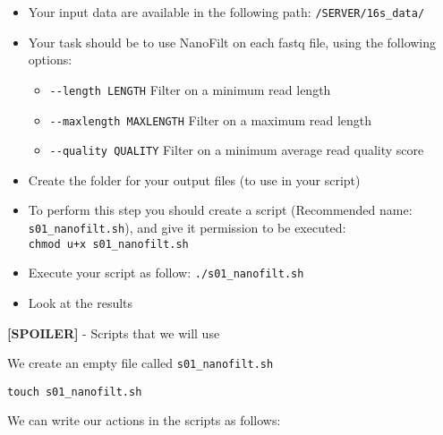 \documentclass[
]{book}
\newenvironment{Shaded}{\begin{snugshade}}{\end{snugshade}}
\newcommand{\AttributeTok}[1]{\textcolor[rgb]{0.13,0.29,0.53}{#1}}
\newcommand{\BuiltInTok}[1]{#1}
\newcommand{\CommentTok}[1]{\textcolor[rgb]{0.56,0.35,0.01}{\textit{#1}}}
\newcommand{\ControlFlowTok}[1]{\textcolor[rgb]{0.13,0.29,0.53}{\textbf{#1}}}
\newcommand{\ExtensionTok}[1]{#1}
\newcommand{\FunctionTok}[1]{\textcolor[rgb]{0.13,0.29,0.53}{\textbf{#1}}}
\newcommand{\KeywordTok}[1]{\textcolor[rgb]{0.13,0.29,0.53}{\textbf{#1}}}
\newcommand{\NormalTok}[1]{#1}
\newcommand{\OperatorTok}[1]{\textcolor[rgb]{0.81,0.36,0.00}{\textbf{#1}}}
\newcommand{\PreprocessorTok}[1]{\textcolor[rgb]{0.56,0.35,0.01}{\textit{#1}}}
\newcommand{\StringTok}[1]{\textcolor[rgb]{0.31,0.60,0.02}{#1}}
\newcommand{\VariableTok}[1]{\textcolor[rgb]{0.00,0.00,0.00}{#1}}
\providecommand{\tightlist}{%
  \setlength{\itemsep}{0pt}\setlength{\parskip}{0pt}}
\begin{document}
\begin{itemize}
\tightlist
\item
  Your input data are available in the following path: \texttt{/SERVER/16s\_data/}
\item
  Your task should be to use NanoFilt on each fastq file, using the following options:

  \begin{itemize}
  \tightlist
  \item
    \texttt{-\/-length\ LENGTH} Filter on a minimum read length
  \item
    \texttt{-\/-maxlength\ MAXLENGTH} Filter on a maximum read length
  \item
    \texttt{-\/-quality\ QUALITY} Filter on a minimum average read quality score
  \end{itemize}
\item
  Create the folder for your output files (to use in your script)
\item
  To perform this step you should create a script (Recommended name: \texttt{s01\_nanofilt.sh}), and give it permission to be executed: \texttt{chmod\ u+x\ s01\_nanofilt.sh}
\item
  Execute your script as follow: \texttt{./s01\_nanofilt.sh}
\item
  Look at the results
\end{itemize}

\textbf{{[}SPOILER{]}} - Scripts that we will use

We create an empty file called \texttt{s01\_nanofilt.sh}

\texttt{touch\ s01\_nanofilt.sh}

We can write our actions in the scripts as follows:

\begin{Shaded}
\end{Shaded}
\end{document}
